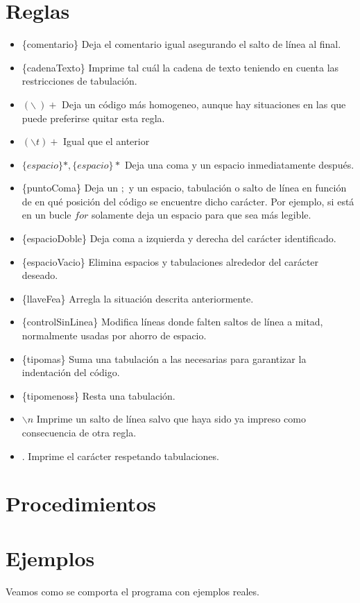\documentclass[11pt,spanish]{article} %
\begin{document}
\section{Reglas}
\begin{itemize}
	\item \{comentario\} Deja el comentario igual asegurando el salto de línea al final.
	\item \{cadenaTexto\} Imprime tal cuál la cadena de texto teniendo en cuenta las restricciones de tabulación.
	\item $(\backslash \ )+$ Deja un código más homogeneo, aunque hay situaciones en las que puede preferirse quitar esta regla.
	\item $(\backslash t)+$ Igual que el anterior
	\item $\{espacio\}*,\{espacio\}*$ Deja una coma y un espacio inmediatamente después.
	\item \{puntoComa\} Deja un $;$ y un espacio, tabulación o salto de línea en función de en qué posición del código se encuentre dicho carácter. Por ejemplo, si está en un bucle $for$ solamente deja un espacio para que sea más legible.
	\item \{espacioDoble\} Deja coma a izquierda y derecha del carácter identificado.
	\item \{espacioVacio\} Elimina espacios y tabulaciones alrededor del carácter deseado.
	\item \{llaveFea\} Arregla la situación descrita anteriormente.
	\item \{controlSinLinea\} Modifica líneas donde falten saltos de línea a mitad, normalmente usadas por ahorro de espacio.
	\item \{tipomas\} Suma una tabulación a las necesarias para garantizar la indentación del código.
	\item \{tipomenoss\} Resta una tabulación.
	\item $\backslash n$ Imprime un salto de línea salvo que haya sido ya impreso como consecuencia de otra regla.
	\item .	Imprime el carácter respetando tabulaciones.
\end{itemize}



\section{Procedimientos}



\section{Ejemplos}
Veamos como se comporta el programa con ejemplos reales.
\end{document}
